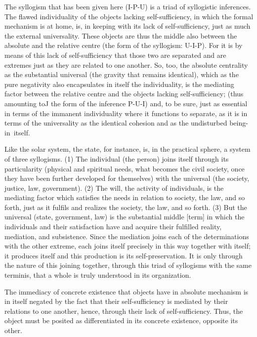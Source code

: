 The syllogism that has been given here (I-P-U)
is a triad of syllogistic inferences.
The flawed individuality of the objects lacking self-sufficiency,
in which the formal mechanism is at home, is,
in keeping with its lack of self-sufficiency,
just as much the external universality.
These objects are thus the middle also
between the absolute and the relative centre
(the form of the syllogism: U-I-P).
For it is by means of this lack of self-sufficiency
that those two are separated and are extremes
just as they are related to one another.
So, too, the absolute centrality as the substantial universal
(the gravity that remains identical),
which as the pure negativity
also encapsulates in itself the individuality,
is the mediating factor between the relative centre
and the objects lacking self-sufficiency;
(thus amounting toJ the form of the inference P-U-I)
and, to be sure, just as essential
in terms of the immanent individuality
where it functions to separate,
as it is in terms of the universality
as the identical cohesion and
as the undisturbed being-in~itself.

Like the solar system, the state, for instance, is,
in the practical sphere, a system of three syllogisms.
(1) The individual (the person) joins itself through its particularity
(physical and spiritual needs, what becomes the civil society,
once they have been further developed for themselves)
with the universal (the society, justice, law, government).
(2) The will, the activity of individuals, is the mediating factor
which satisfies the needs in relation to society, the law, and so forth,
just as it fulfils and realizes the society, the law, and so forth.
(3) But the universal (state, government, law)
is the substantial middle [term]
in which the individuals and their satisfaction
have and acquire their fulfilled reality, mediation, and subsistence.
Since the mediation joins each of the determinations with the other extreme,
each joins itself precisely in this way together with itself;
it produces itself and this production is its self-preservation.
It is only through the nature of this joining together,
through this triad of syllogisms with the same terminis,
that a whole is truly understood in its organization.

The immediacy of concrete existence
that objects have in absolute mechanism
is in itself negated by the fact that
their self-sufficiency is mediated by
their relations to one another, hence,
through their lack of self-sufficiency.
Thus, the object must be posited as
differentiated in its concrete existence,
opposite its other.

